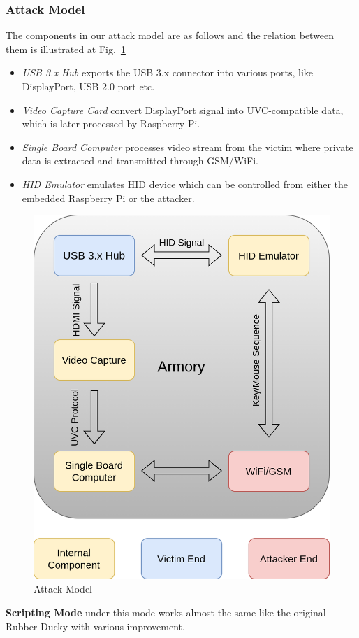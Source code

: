 \subsubsection{Attack Model}
The components in our attack model are as follows and the relation between them is illustrated at Fig.~\ref{fig:attack_model}
\begin{itemize}
	\item\textit{USB 3.x Hub} exports the USB 3.x connector into various ports, like DisplayPort, USB 2.0 port etc.
	\item\textit{Video Capture Card} convert DisplayPort signal into UVC-compatible data, which is later processed by Raspberry Pi.
	\item\textit{Single Board Computer} processes video stream from the victim where private data is extracted and transmitted through GSM/WiFi.
	\item\textit{HID Emulator} emulates HID device which can be controlled from either the embedded Raspberry Pi or the attacker.
\end{itemize}
\begin{figure}[hbtp]
	\includegraphics[width=\linewidth]{./Figs/attack_model.png}
	\caption{Attack Model}
	\label{fig:attack_model}
\end{figure}
\textbf{Scripting Mode}
\tool under this mode works almost the same like the original Rubber Ducky with various improvement.


